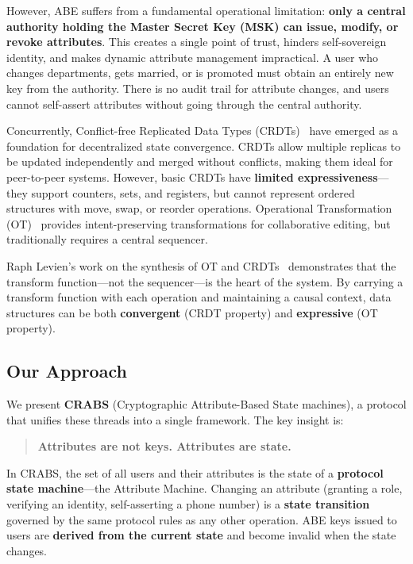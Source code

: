 \documentclass[sigconf,nonacm]{acmart}
\newcommand{\crab}{\textsc{CRABS}}
\begin{document}
However, ABE suffers from a fundamental operational limitation: \textbf{only a central authority holding the Master Secret Key (MSK) can issue, modify, or revoke attributes}. This creates a single point of trust, hinders self-sovereign identity, and makes dynamic attribute management impractical. A user who changes departments, gets married, or is promoted must obtain an entirely new key from the authority. There is no audit trail for attribute changes, and users cannot self-assert attributes without going through the central authority.

Concurrently, Conflict-free Replicated Data Types (CRDTs)~\cite{shapiro2011crdt} have emerged as a foundation for decentralized state convergence. CRDTs allow multiple replicas to be updated independently and merged without conflicts, making them ideal for peer-to-peer systems. However, basic CRDTs have \textbf{limited expressiveness}---they support counters, sets, and registers, but cannot represent ordered structures with move, swap, or reorder operations. Operational Transformation (OT)~\cite{ellis1989ot} provides intent-preserving transformations for collaborative editing, but traditionally requires a central sequencer.

Raph Levien's work on the synthesis of OT and CRDTs~\cite{levien2016otcrdt} demonstrates that the transform function---not the sequencer---is the heart of the system. By carrying a transform function with each operation and maintaining a causal context, data structures can be both \textbf{convergent} (CRDT property) and \textbf{expressive} (OT property).

\subsection{Our Approach}

We present \textbf{\crab{}} (Cryptographic Attribute-Based State machines), a protocol that unifies these threads into a single framework. The key insight is:

\begin{quote}
\textbf{Attributes are not keys. Attributes are state.}
\end{quote}

In \crab{}, the set of all users and their attributes is the state of a \textbf{protocol state machine}---the Attribute Machine. Changing an attribute (granting a role, verifying an identity, self-asserting a phone number) is a \textbf{state transition} governed by the same protocol rules as any other operation. ABE keys issued to users are \textbf{derived from the current state} and become invalid when the state changes.
\end{document}
